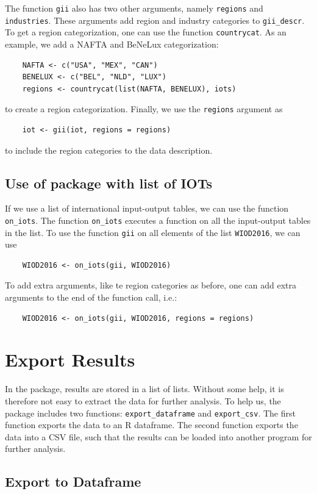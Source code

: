 \documentclass[10pt,a4paper]{paper}
\begin{document}
	The function \texttt{gii} also has two other arguments, namely \texttt{regions} and \texttt{industries}. These arguments add region and industry categories to \texttt{gii\_descr}. To get a region categorization, one can use the function \texttt{countrycat}. As an example, we add a NAFTA and BeNeLux categorization:
	\begin{Verbatim}
	NAFTA <- c("USA", "MEX", "CAN")
	BENELUX <- c("BEL", "NLD", "LUX") 
	regions <- countrycat(list(NAFTA, BENELUX), iots)
	\end{Verbatim} 
	to create a region categorization. Finally, we use the \texttt{regions} argument as
	\begin{Verbatim}
	iot <- gii(iot, regions = regions)
	\end{Verbatim}
	to include the region categories to the data description.
	
	\subsection{Use of package with list of IOTs}
	If we use a list of international input-output tables, we can use the function \texttt{on\_iots}. The function \texttt{on\_iots} executes a function on all the input-output tables in the list. To use the function \texttt{gii} on all elements of the list \texttt{WIOD2016}, we can use
	\begin{Verbatim}
	WIOD2016 <- on_iots(gii, WIOD2016)
	\end{Verbatim}
	To add extra arguments, like te region categories as before, one can add extra arguments to the end of the function call, i.e.:
	\begin{Verbatim}
	WIOD2016 <- on_iots(gii, WIOD2016, regions = regions)
	\end{Verbatim}
	
	\section{Export Results}
	In the package, results are stored in a list of lists. Without some help, it is therefore not easy to extract the data for further analysis. To help us, the package includes two functions: \texttt{export\_dataframe} and \texttt{export\_csv}. The first function exports the data to an R dataframe. The second function exports the data into a CSV file, such that the results can be loaded into another program for further analysis.
	\subsection{Export to Dataframe}
	
\end{document}
